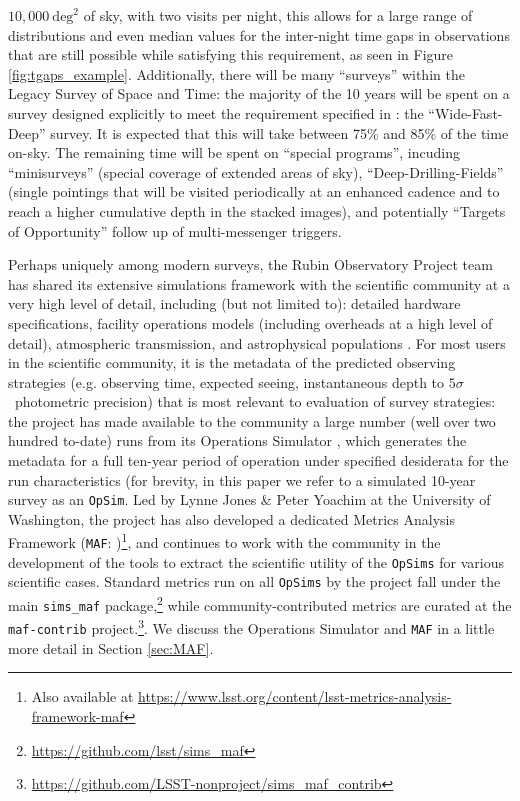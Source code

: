 \documentclass[onecolumn, 10pt]{aastex63}
\newcommand{\opsim}{\texttt{OpSim}}
\begin{document}
$10,000 ~\mathrm{deg}^2$ of sky, with two visits per night, this allows for a large range of distributions and even median values for the inter-night time gaps in observations that are still possible while satisfying this requirement, as seen in Figure \ref{fig:tgaps_example}. {Additionally, there will be many ``surveys'' within the Legacy Survey of Space and Time: the majority of the 10 years will be spent on a survey designed explicitly to meet the requirement specified in \cite{designSystem}: the ``Wide-Fast-Deep'' survey. It is expected that this will take between 75\% and 85\% of the time on-sky. The remaining time will be spent on ``special programs'', incuding ``minisurveys'' (special coverage of extended areas of sky), ``Deep-Drilling-Fields'' (single pointings that will be visited periodically at an enhanced cadence and to reach a higher cumulative depth in the stacked images), and potentially ``Targets of Opportunity'' follow up of multi-messenger triggers.}

{Perhaps uniquely among modern surveys, the Rubin Observatory Project team has shared its extensive simulations framework with the scientific community at a very high level of detail, including (but not limited to): detailed hardware specifications, facility operations models (including overheads at a high level of detail), atmospheric transmission, and astrophysical populations \citep{simsFramework}. For most users in the scientific community, it is the metadata of the predicted observing strategies (e.g. observing time, expected seeing, instantaneous depth to $5\sigma$~photometric precision) that is most relevant to evaluation of survey strategies: the project has made available to the community a large number (well over two hundred to-date) runs from its Operations Simulator \citep{opsim}, which generates the metadata for a full ten-year period of operation under specified desiderata for the run characteristics (for brevity, in this paper we refer to a simulated 10-year survey as an \opsim. Led by Lynne Jones \& Peter Yoachim at the University of Washington, the project has also developed a dedicated Metrics Analysis Framework (\texttt{MAF}: \citealt{maf})\footnote{Also available at \url{https://www.lsst.org/content/lsst-metrics-analysis-framework-maf}}, and continues to work with the community in the development of the tools to extract the scientific utility of the \texttt{OpSims} for various scientific cases. Standard metrics run on all \texttt{OpSims} by the project fall under the main \texttt{sims\_maf} package,\footnote{\url{https://github.com/lsst/sims_maf}} while community-contributed metrics are curated at the \texttt{maf-contrib} project.\footnote{\url{https://github.com/LSST-nonproject/sims_maf_contrib}}. We discuss the Operations Simulator and \texttt{MAF} in a little more detail in Section \ref{sec:MAF}.}
\end{document}
